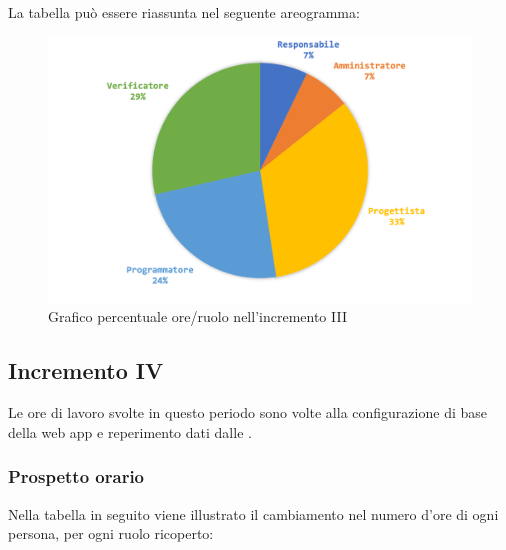 			La tabella può essere riassunta nel seguente areogramma:
			\begin{figure}[H]
				\centering
				\includegraphics[width=0.8\linewidth]{images/consuntivo/ConsIncr3-2.png}
				\caption{Grafico percentuale ore/ruolo nell'incremento III}
				\label{fig:consuntivo grafico costi ruolo incremento III}
			\end{figure}
			\pagebreak

		
		\subsection{Incremento IV}
		Le ore di lavoro svolte in questo periodo sono volte alla configurazione di base della web app e reperimento dati dalle .
		\subsubsection{Prospetto orario}
			Nella tabella in seguito viene illustrato il cambiamento nel numero d'ore di ogni persona, per ogni ruolo ricoperto:
			
